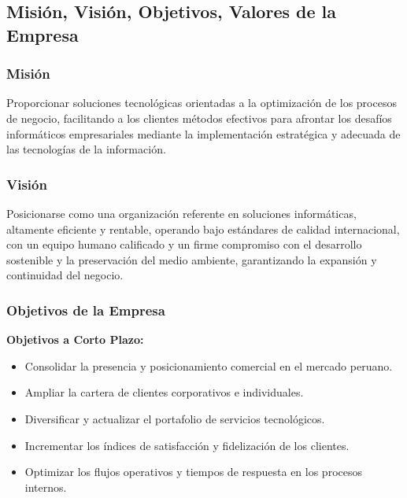 \subsection{Misión, Visión, Objetivos, Valores de la Empresa}

\subsubsection{Misión}
Proporcionar soluciones tecnológicas orientadas a la optimización de los procesos de negocio, facilitando a los clientes métodos efectivos para afrontar los desafíos informáticos empresariales mediante la implementación estratégica y adecuada de las tecnologías de la información.


\subsubsection{Visión}
Posicionarse como una organización referente en soluciones informáticas, altamente eficiente y rentable, operando bajo estándares de calidad internacional, con un equipo humano calificado y un firme compromiso con el desarrollo sostenible y la preservación del medio ambiente, garantizando la expansión y continuidad del negocio.


\subsubsection{Objetivos de la Empresa}

\noindent\textbf{Objetivos a Corto Plazo:}
\begin{itemize}
    \item Consolidar la presencia y posicionamiento comercial en el mercado peruano.
    \item Ampliar la cartera de clientes corporativos e individuales.
    \item Diversificar y actualizar el portafolio de servicios tecnológicos.
    \item Incrementar los índices de satisfacción y fidelización de los clientes.
    \item Optimizar los flujos operativos y tiempos de respuesta en los procesos internos.
\end{itemize}

